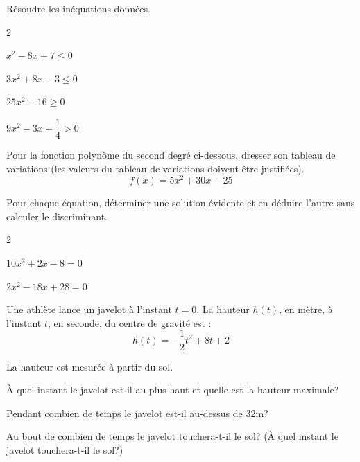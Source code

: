 \documentclass[12pt,a4paper]{article}  %
\begin{document}
\vspace{-0.3cm}

Résoudre les inéquations données.
\begin{multicols}{2}
\begin{enumMet}
    \item {} $x^{2}-8 x+7 \leqslant 0$
    \item $3 x^{2}+8 x-3 \leqslant 0$
    \item $25 x^{2}-16 \geqslant 0$
    \item $9 x^{2}-3x+\dfrac{1}{4}>0$
\end{enumMet}
\end{multicols}

\vspace{-0.3cm}
Pour la fonction polynôme du second degré ci-dessous, dresser son tableau de variations (les valeurs du tableau de variations doivent être justifiées).
$$f(x)=5x^2+30x-25$$

\vspace{-0.3cm}

Pour chaque équation, déterminer une solution évidente et en déduire l'autre sans calculer le discriminant.
\begin{multicols}{2}
\begin{enumMet}
    \item $10x^2+2x-8=0$
    \item $2x^2-18x+28=0$
\end{enumMet}
\end{multicols}

\newpage


Une athlète lance un javelot à l'instant $t=0$. La hauteur $h(t)$, en mètre, à l'instant $t$, en seconde, du centre de gravité est :
$$
h(t)=-\frac{1}{2} t^2+8 t+2
$$

La hauteur est mesurée à partir du sol.
\begin{enumMet}
	\item À quel instant le javelot est-il au plus haut et quelle est la hauteur maximale?
	\item Pendant combien de temps le javelot est-il au-dessus de 32m?
	\item Au bout de combien de temps le javelot touchera-t-il le sol? (À quel instant le javelot touchera-t-il le sol?)
\end{enumMet}
\end{document}
